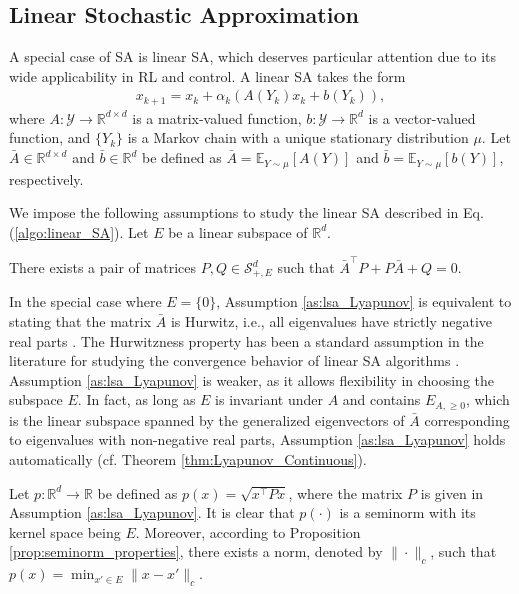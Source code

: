 \documentclass[11 pt]{article}
\begin{document}
	\subsection{Linear Stochastic Approximation}\label{sec:linear_SA}
	A special case of SA is linear SA, which deserves particular attention due to its wide applicability in RL and control. A linear SA takes the form  
	\begin{align}\label{algo:linear_SA}  
		x_{k+1} = x_k + \alpha_k \left(A(Y_k)x_k + b(Y_k)\right),  
	\end{align}  
	where $A:\mathcal{Y} \to \mathbb{R}^{d \times d}$ is a matrix-valued function, $b:\mathcal{Y} \to \mathbb{R}^d$ is a vector-valued function, and $\{Y_k\}$ is a Markov chain with a unique stationary distribution $\mu$. Let $\bar{A} \in \mathbb{R}^{d \times d}$ and $\bar{b} \in \mathbb{R}^d$ be defined as $\bar{A} = \mathbb{E}_{Y \sim \mu}[A(Y)]$ and $\bar{b} = \mathbb{E}_{Y \sim \mu}[b(Y)]$, respectively. 
	
	
	
	We impose the following assumptions to study the linear SA described in Eq. (\ref{algo:linear_SA}). Let $E$ be a linear subspace of $\mathbb{R}^d$.
	
	
	\begin{assumption}\label{as:lsa_Lyapunov}
		There exists a pair of matrices $ P,Q \in \mathcal{S}_{+,E}^d $ such that $ \bar{A}^\top P + P\bar{A} + Q = 0 $.
	\end{assumption}
	
	
	In the special case where $ E = \{0\} $, Assumption \ref{as:lsa_Lyapunov} is equivalent to stating that the matrix $ \bar{A} $ is Hurwitz, i.e., all eigenvalues have strictly negative real parts \cite{khalil2002nonlinear,haddad2008nonlinear}. The Hurwitzness property has been a standard assumption in the literature for studying the convergence behavior of linear SA algorithms \cite{bertsekas1996neuro,srikant2019finite}. Assumption \ref{as:lsa_Lyapunov} is weaker, as it allows flexibility in choosing the subspace $ E $. In fact, as long as $ E $ is invariant under $A$ and contains $E_{A,\geq 0}$, which is the linear subspace spanned by the generalized eigenvectors of $ \bar{A} $ corresponding to eigenvalues with non-negative real parts, Assumption \ref{as:lsa_Lyapunov} holds automatically (cf. Theorem \ref{thm:Lyapunov_Continuous}).
	
	Let $p:\mathbb{R}^d\to \mathbb{R}$ be defined as $p(x)=\sqrt{x^\top Px}$, where the matrix $P$ is given in Assumption \ref{as:lsa_Lyapunov}. It is clear that $p(\cdot)$ is a seminorm with its kernel space being $E$. Moreover, according to Proposition \ref{prop:seminorm_properties}, there exists a norm, denoted by $\|\cdot\|_c$, such that $p(x)=\min_{x'\in E}\|x-x'\|_c$.
	
\end{document}
